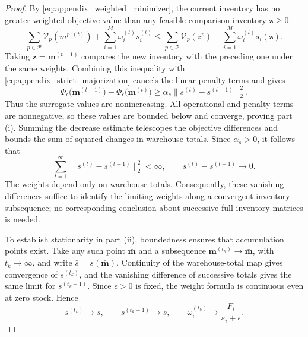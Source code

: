 \documentclass[a4paper,fleqn]{cas-sc}
\theoremstyle{remark}
\theoremstyle{plain}
\begin{document}
\begin{proof}
By \eqref{eq:appendix_weighted_minimizer}, the current inventory has no greater weighted objective value than any feasible comparison inventory $\mathbf z\ge0$:
\begin{equation}\label{eq:appendix_weighted_optimality}
    \sum_{p\in\mathcal P}\mathcal V_p(m^{p,(t)})+\sum_{i=1}^M\omega_i^{(t)}s_i^{(t)}\le\sum_{p\in\mathcal P}\mathcal V_p(z^p)+\sum_{i=1}^M\omega_i^{(t)}s_i(\mathbf z).
\end{equation}
Taking $\mathbf z=\mathbf m^{(t-1)}$ compares the new inventory with the preceding one under the same weights. Combining this inequality with \eqref{eq:appendix_strict_majorization} cancels the linear penalty terms and gives
\begin{equation}\label{eq:appendix_aggregate_decrease}
    \Phi_\epsilon\bigl(\mathbf m^{(t-1)}\bigr)-\Phi_\epsilon\bigl(\mathbf m^{(t)}\bigr)\ge\alpha_s\|s^{(t)}-s^{(t-1)}\|_2^2.
\end{equation}
Thus the surrogate values are nonincreasing. All operational and penalty terms are nonnegative, so these values are bounded below and converge, proving part (i). Summing the decrease estimate telescopes the objective differences and bounds the sum of squared changes in warehouse totals. Since $\alpha_s>0$, it follows that
\[
    \sum_{t=1}^{\infty}\|s^{(t)}-s^{(t-1)}\|_2^2<\infty,\qquad s^{(t)}-s^{(t-1)}\longrightarrow0.
\]
The weights depend only on warehouse totals. Consequently, these vanishing differences suffice to identify the limiting weights along a convergent inventory subsequence; no corresponding conclusion about successive full inventory matrices is needed.

To establish stationarity in part (ii), boundedness ensures that accumulation points exist. Take any such point $\bar{\mathbf m}$ and a subsequence $\mathbf m^{(t_k)}\to\bar{\mathbf m}$, with $t_k\to\infty$, and write $\bar s=s(\bar{\mathbf m})$. Continuity of the warehouse-total map gives convergence of $s^{(t_k)}$, and the vanishing difference of successive totals gives the same limit for $s^{(t_k-1)}$. Since $\epsilon>0$ is fixed, the weight formula is continuous even at zero stock. Hence
\[
    s^{(t_k)}\longrightarrow\bar s,\qquad s^{(t_k-1)}\longrightarrow\bar s,\qquad\omega_i^{(t_k)}\longrightarrow\frac{F_i}{\bar s_i+\epsilon}.
\]


\end{proof}
\end{document}
